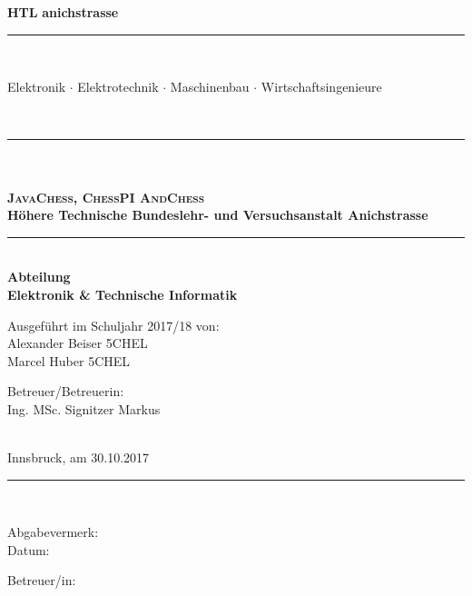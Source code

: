 \documentclass[12pt,a4paper]{article}
\begin{document}
\newcommand{\HtlHeader}[0]{%
	\hspace*{-11mm}%
	\raisebox{-1mm}{\logoB{0.12}}%
	\hspace*{2mm}%
	\parbox[b]{110mm}{\flushleft
		{\fontsize{20pt}{20pt}\selectfont\bf HTL}
		{\fontsize{16.2pt}{16.2pt}\selectfont\color{teal}\bf anichstrasse}
		\\[-4.05mm]{\color{darkgray}\rule{110mm}{0.5pt}}
		\\[-2.24mm]{\fontsize{7pt}{7pt}\selectfont\color{darkgray}
			Elektronik $\cdot$ Elektrotechnik $\cdot$
			Maschinenbau $\cdot$ Wirtschaftsingenieure
			\rule{0pt}{0mm}
		}
	}%
	\hspace*{5mm}%
	\\[-1.5mm]\rule{\textwidth}{0.5pt}
}%







\begin{titlepage}
 \begin{center}
   \begin{minipage}{\linewidth}
   \begin{center}
   \HtlHeader{}
	\vspace*{-10mm}
	{\fontsize{25pt}{25pt}\selectfont\bf \\[10mm]}
	\\[19mm]{\fontsize{20pt}{20pt}\selectfont\textbf{\textsc{JavaChess, ChessPI AndChess}}}
	\\[15mm]{\fontsize{12.4pt}{12.4pt}\selectfont\bf
		Höhere Technische Bundeslehr- und Versuchsanstalt Anichstrasse}
	\\[ 5mm]\rule{132mm}{1.0pt}
	\\[ 4mm]{\fontsize{12.4pt}{12.4pt}\selectfont\bf Abteilung}
	\\[ 5mm]{\fontsize{12.4pt}{12.4pt}\selectfont\bf Elektronik \& Technische Informatik}
	\\[24mm]{\hspace*{2mm}\parbox{154mm}{\fontsize{12.4pt}{12.4pt}\selectfont
	  \parbox[t]{75mm}{
		Ausgeführt im Schuljahr 2017/18 von:
		\\[5.0mm]Alexander Beiser 5CHEL
		\\[2.5mm]Marcel Huber 5CHEL 
	  }
	  \hspace*{6mm}
	  \parbox[t]{50mm}{
		Betreuer/Betreuerin:
		\\[5.0mm]Ing. MSc. Signitzer Markus
	  }
	  \\[14mm]{Innsbruck, am 30.10.2017}
	  \\[16mm]\rule{150mm}{0.5pt}
	  \\[ 8mm]
	  \parbox[t]{75mm}{
		Abgabevermerk:
		\\[3.25mm]Datum:
	  }
	  \hspace*{6mm}
	  \parbox[t]{50mm}{
		Betreuer/in:
	  }
	}}
   \end{center}\hfill
   \end{minipage}
 \end{center}
\end{titlepage}
\end{document}
